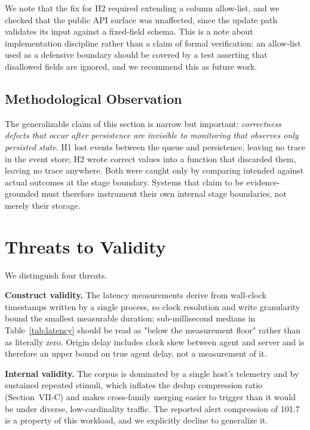\documentclass[conference]{IEEEtran}
\begin{document}
We note that the fix for H2 required extending a column allow-list, and we
checked that the public API surface was unaffected, since the update path
validates its input against a fixed-field schema. This is a note about
implementation discipline rather than a claim of formal verification: an
allow-list used as a defensive boundary should be covered by a test asserting
that disallowed fields are ignored, and we recommend this as future work.

\subsection{Methodological Observation}

The generalizable claim of this section is narrow but important:
\emph{correctness defects that occur after persistence are invisible to
monitoring that observes only persisted state}. H1 lost events between the
queue and persistence, leaving no trace in the event store; H2 wrote correct
values into a function that discarded them, leaving no trace anywhere. Both
were caught only by comparing intended against actual outcomes at the stage
boundary. Systems that claim to be evidence-grounded must therefore instrument
their own internal stage boundaries, not merely their storage.

\section{Threats to Validity}

We distinguish four threats.

\textbf{Construct validity.} The latency measurements derive from wall-clock
timestamps written by a single process, so clock resolution and write
granularity bound the smallest measurable duration; sub-millisecond medians
in Table~\ref{tab:latency} should be read as "below the measurement floor"
rather than as literally zero. Origin delay includes clock skew between agent
and server and is therefore an upper bound on true agent delay, not a
measurement of it.

\textbf{Internal validity.} The corpus is dominated by a single host's
telemetry and by sustained repeated stimuli, which inflates the
dedup compression ratio (Section~VII-C) and makes cross-family merging easier
to trigger than it would be under diverse, low-cardinality traffic. The
reported alert compression of 101.7 is a property of this workload, and we
explicitly decline to generalize it.
\end{document}
